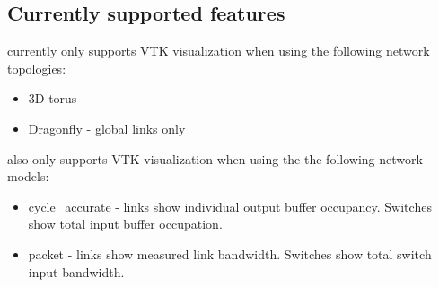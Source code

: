 \subsection{Currently supported features}

\sstmacro currently only supports VTK visualization when using the following network topologies:

\begin{itemize}
\item 3D torus
\item Dragonfly - global links only
\end{itemize}

\sstmacro also only supports VTK visualization when using the the following network models:

\begin{itemize}
\item cycle\_accurate - links show individual output buffer occupancy.  Switches show total input buffer occupation. 
\item packet - links show measured link bandwidth. Switches show total switch input bandwidth.
\end{itemize}